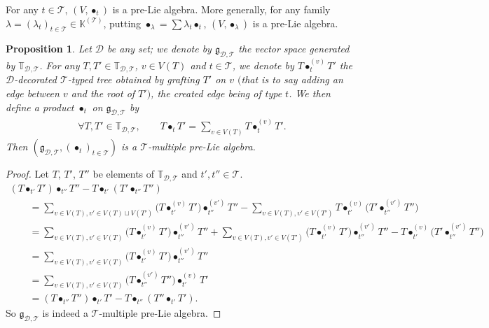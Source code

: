 \documentclass[11pt]{article}
\numberwithin{equation}{section}
\numberwithin{equation}{section}
\newtheorem{Proposition}[Theorem]{Proposition}
 { \theoremstyle{definition}
\newtheorem{Definition}[Theorem]{Definition}
\newtheorem{Note}[Theorem]{Note}
\newtheorem{Example}[Theorem]{Example}
\newtheorem{Remark}[Theorem]{Remark}
\newtheorem{Notation}[Theorem]{Notation}}
\newcommand{\K}{\mathbb{K}}
\newcommand{\T}{\mathcal{T}}
\newcommand{\D}{\mathcal{D}}
\newcommand{\g}{\mathfrak{g}}
\newcommand{\bfT}{\mathbb{T}}
\begin{document}
\begin{Remark}
For any $t\in \T$, $(V,\bullet_t)$ is a pre-Lie algebra.
More generally, for any family $\lambda=(\lambda_t)_{t\in \T}\in \K^{(\T)}$,
putting $\bullet_\lambda=\sum \lambda_t \bullet_t$, $(V,\bullet_\lambda)$ is a pre-Lie algebra.
\end{Remark}

\begin{Proposition}
Let $\D$ be any set; we denote by $\g_{\D,\T}$ the vector space generated by $\bfT_{\D,\T}$.
For any $T,T'\in \bfT_{\D,\T}$,
$v\in V(T)$ and $t\in \T$, we denote by $T\bullet_t^{(v)} T'$ the $\D$-decorated $\T$-typed tree
obtained by grafting $T'$ on $v$ $($that is to say adding an edge between $v$ and the root of $T')$, the created edge being of type $t$.
We then define a product $\bullet_t$ on $\g_{\D,\T}$ by
\begin{gather*}
\forall T,T'\in \bfT_{\D,\T},\qquad
T\bullet_t T'=\sum_{v\in V(T)} T\bullet_t^{(v)} T'.
\end{gather*}
Then $(\g_{\D,\T},(\bullet_t)_{t\in \T})$ is a $\T$-multiple pre-Lie algebra.
\end{Proposition}

\begin{proof} Let $T$, $T'$, $T''$ be elements of $\bfT_{\D,\T}$ and $t',t''\in \T$.
\begin{gather*}
(T\bullet_{t'} T')\bullet_{t''} T''-T\bullet_{t'}(T'\bullet_{t''}T'')
\\ \qquad
{}=\sum_{v\in V(T), v'\in V(T)\sqcup V(T')} \big(T\bullet_{t'}^{(v)} T'\big)\bullet_{t''}^{(v')} T''
-\sum_{v\in V(T),v'\in V(T')}T\bullet_{t'}^{(v)}\big(T'\bullet_{t''}^{(v')} T''\big)
\\ \qquad
{}=\sum_{v\in V(T), v'\in V(T)}\!\!\!\!\!\! \big(T\bullet_{t'}^{(v)} T'\big)\bullet_{t''}^{(v')} T''
\!+\!\!\!\sum_{v\in V(T),v'\in V(T')}\!\!\!\!\!\!\big(T\bullet_{t'}^{(v)} T'\big)\bullet_{t''}^{(v')} T''
\!-T\bullet_{t'}^{(v)}\!\big(T'\bullet_{t''}^{(v')} T''\big)
\\ \qquad
{}=\sum_{v\in V(T), v'\in V(T)} \big(T\bullet_{t'}^{(v)} T'\big)\bullet_{t''}^{(v')} T''
\\ \qquad
{}=\sum_{v\in V(T), v'\in V(T)} \big(T\bullet_{t''}^{(v')} T''\big)\bullet_{t'}^{(v)} T'
\\ \qquad
{}=(T\bullet_{t''} T'')\bullet_{t'} T'-T\bullet_{t''}(T''\bullet_{t'}T').
\end{gather*}
So $\g_{\D,\T}$ is indeed a $\T$-multiple pre-Lie algebra.
\end{proof}
\end{document}
